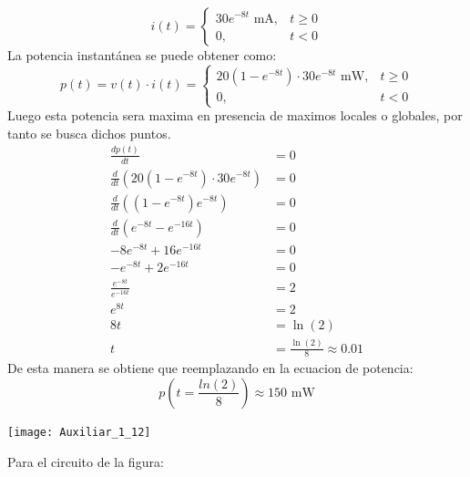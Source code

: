 \documentclass[
  11pt,
  letterpaper,
   addpoints,
  ]{exam}
\begin{document}
\begin{questions}
\begin{solution}
            \begin{equation}
            i(t) =
            \begin{cases} 
            30e^{-8t} \text{ mA}, & t \geq 0 \\ 
            0, & t < 0 
            \end{cases}
         \end{equation}
        La potencia instantánea se puede obtener como:
        \begin{equation}
            p(t) = v(t) \cdot i(t) =
            \begin{cases} 
            20(1 - e^{-8t}) \cdot 30e^{-8t} \text{ mW}, & t \geq 0 \\ 
            0, & t < 0
            \end{cases}
        \end{equation}
        Luego esta potencia sera maxima en presencia de maximos locales o globales, por tanto se busca dichos puntos.
        \begin{align}
            \frac{dp(t)}{dt} &= 0 \\
            \frac{d}{dt} \left( 20(1 - e^{-8t}) \cdot 30e^{-8t} \right) &= 0\\
            \frac{d}{dt} \left( (1 - e^{-8t}) e^{-8t} \right) &= 0 \\
            \frac{d}{dt} \left( e^{-8t} - e^{-16t} \right) &= 0\\
            -8 e^{-8t} + 16 e^{-16t} &= 0 \\
            - e^{-8t} + 2 e^{-16t} &= 0\\
            \frac{e^{-8t}}{e^{-16t}} &= 2\\
            e^{8t} &= 2\\
            8t &= \ln(2)\\
            t &= \frac{\ln(2)}{8} \approx 0.01
        \end{align}
        De esta manera se obtiene que reemplazando en la ecuacion de potencia:
        \begin{equation}
        p\left(t= \frac{ln(2)}{8}\right) \approx 150 \text{ mW}
        \end{equation}
        \begin{center}
            \texttt{[image: Auxiliar\_1\_12]}
        \end{center}
    \end{solution}
    \question  Para el circuito de la figura:


\end{questions}
\end{document}
